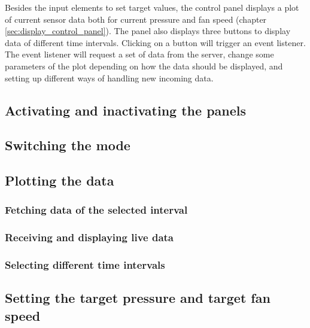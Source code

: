 Besides the input elements to set target values, the control panel displays a plot of current sensor data both for current pressure and fan speed (chapter \ref{sec:display_control_panel}). The panel also displays three buttons to display data of different time intervals. Clicking on a button will trigger an event listener. The event listener will request a set of data from the server, change some parameters of the plot depending on how the data should be displayed, and setting up different ways of handling new incoming data.



\subsection{Activating and inactivating the panels}
\label{subsec:activating_and_inactivating_the_panels}



\subsection{Switching the mode}
\label{subsec:switching_the_mode}



\subsection{Plotting the data}
\label{subsec:plotting_the_data}


\subsubsection{Fetching data of the selected interval}
\label{subsec:fetching_data_of_the_selected_interval}


\subsubsection{Receiving and displaying live data}
\label{subsec:receiving_and_displaying_live_data}


\subsubsection{Selecting different time intervals}
\label{subsec:selecting_different_time_intervals}



\subsection{Setting the target pressure and target fan speed}
\label{subsec:setting_the_target_pressure_and_target_fan_speed}



